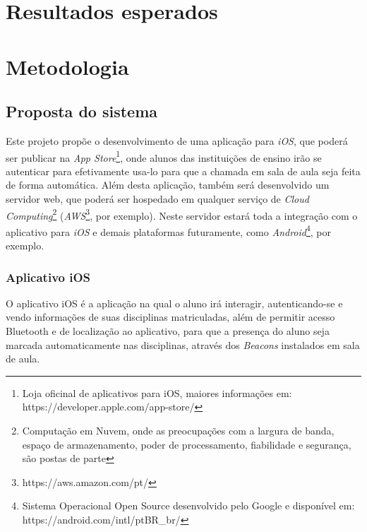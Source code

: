 \documentclass[
	12pt,
	oneside,
	a4paper,
	english,
	brazil,
]{abntex2}
\begin{document}

\chapter{Resultados esperados}


\chapter{Metodologia}
\section{Proposta do sistema}

Este projeto propõe o desenvolvimento de uma aplicação para \emph{iOS}, que poderá ser publicar na \emph{App Store}\footnote{Loja oficinal de aplicativos para iOS, maiores informações em: https://developer.apple.com/app-store/}, onde alunos das instituições de ensino irão se autenticar para efetivamente usa-lo para que a chamada em sala de aula seja feita de forma automática. Além desta aplicação, também será desenvolvido um servidor web, que poderá ser hospedado em qualquer serviço de \emph{Cloud Computing}\footnote{Computação em Nuvem, onde as preocupações com a largura de banda, espaço de armazenamento, poder de processamento, fiabilidade e segurança, são postas de parte\cite{cloud-computing-about}} (\emph{AWS}\footnote{https://aws.amazon.com/pt/}, por exemplo). Neste servidor estará toda a integração com o aplicativo para \emph{iOS} e demais plataformas futuramente, como \emph{Android}\footnote{Sistema Operacional Open Source desenvolvido pelo Google e disponível em: https://android.com/intl/pt\-BR\_br/}, por exemplo.

\subsection{Aplicativo iOS}

O aplicativo iOS é a aplicação na qual o aluno irá interagir, autenticando-se e vendo informações de suas disciplinas matriculadas, além de permitir acesso Bluetooth e de localização ao aplicativo, para que a presença do aluno seja marcada automaticamente nas disciplinas, através dos \emph{Beacons} instalados em sala de aula.
\end{document}
